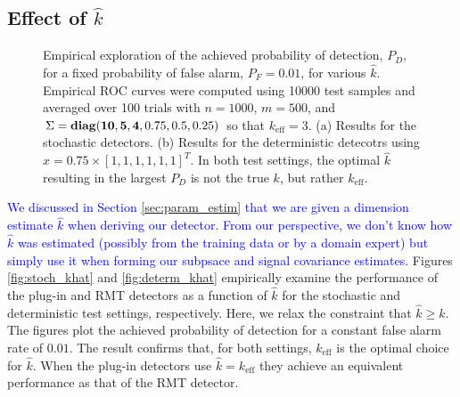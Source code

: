 \subsection{Effect of $\widehat{k}$}
\begin{figure}
\centering
{}
\vspace{-0.1in}
\caption{Empirical exploration of the achieved probability of detection, $P_D$, for a fixed probability of false alarm, $P_F=0.01$, for various $\widehat{k}$. Empirical ROC curves were computed using 10000 test samples and averaged over 100 trials with $n=1000$, $m=500$, and $\Sigma = \mathop{\bf diag}({\bf{10,5,4}},0.75,0.5,0.25)$ so that $k_{\text{eff}}=3$. (a) Results for the stochastic detectors. (b) Results for the deterministic detecotrs using $x=0.75\times[1,1,1,1,1,1]^T$. In both test settings, the optimal $\widehat{k}$ resulting in the largest $P_D$ is not the true $k$, but rather $k_\text{eff}$.}
\label{fig:khat_graphs}
\vspace{-0.3in}
\end{figure}

\textcolor{blue}{We discussed in Section \ref{sec:param_estim} that we are given a dimension estimate $\widehat{k}$ when deriving our detector. From our perspective, we don't know how $\widehat{k}$ was estimated (possibly from the training data or by a domain expert) but simply use it when forming our subpsace and signal covariance estimates.} Figures \ref{fig:stoch_khat} and \ref{fig:determ_khat} empirically examine the performance of the plug-in and RMT detectors as a function of $\widehat{k}$ for the stochastic and deterministic test settings, respectively. Here, we relax the constraint that $\widehat{k}\geq k$. The figures plot the achieved probability of detection for a constant false alarm rate of $0.01$. The result confirms that, for both settings, $k_\text{eff}$ is the optimal choice for $\widehat{k}$. When the plug-in detectors use $\widehat{k} = k_\text{eff}$ they achieve an equivalent performance as that of the RMT detector.

